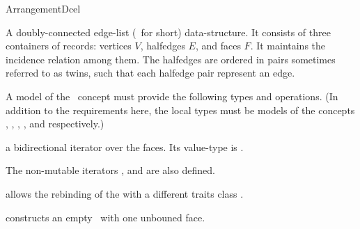 \ccRefPageBegin

\begin{ccRefConcept}{ArrangementDcel}

\ccDefinition
A doubly-connected edge-list (\dcel\ for short) data-structure. It consists
of three containers of records: vertices $V$, halfedges $E$, and faces $F$.
It maintains the incidence relation among them. The halfedges are ordered
in pairs sometimes referred to as twins, such that each halfedge pair
represent an edge.

A model of the \ccRefName\ concept must provide the following types and 
operations. (In addition to the requirements here, the local types 
must be models of the concepts 
,
,
,
, and
 respectively.)

\ccTypes
\ccGlue
{}
\ccGlue
{}
\ccGlue
{}
\ccGlue
{}


\ccGlue
{}
\ccGlue
{}
  {a bidirectional iterator over the faces. Its value-type is .}

The non-mutable iterators ,
 and  are also
defined.

   {allows the rebinding of the \dcel{} with a different traits class .}

\ccCreation
{}
  {constructs an empty \dcel\ with one unbouned face.}


\end{ccRefConcept}
